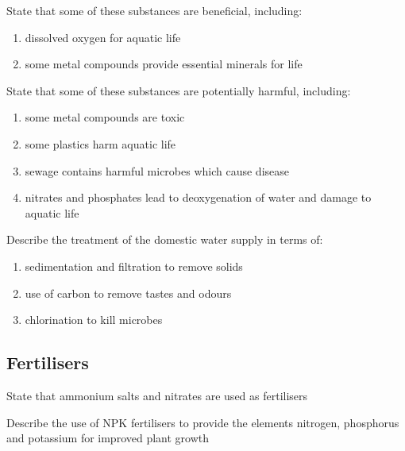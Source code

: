 \begin{point}
State that some of these substances are beneficial, including:

\begin{enumerate}[label=(\alph*)]
	\setlength\itemsep{0em}
	
	\item dissolved oxygen for aquatic life
	\item some metal compounds provide essential minerals for life
\end{enumerate}
\end{point}

\begin{point}
State that some of these substances are potentially harmful, including:
\begin{enumerate}[label=(\alph*)]
	\setlength\itemsep{0em}
	\item some metal compounds are toxic
	\item some plastics harm aquatic life
	\item sewage contains harmful microbes which cause disease
	\item nitrates and phosphates lead to deoxygenation of water and damage to aquatic life
\end{enumerate}
\end{point}

\begin{point}
Describe the treatment of the domestic water supply in terms of:
\begin{enumerate}[label=(\alph*)]
	\setlength\itemsep{0em}
	\item sedimentation and filtration to remove solids
	\item use of carbon to remove tastes and odours
	\item chlorination to kill microbes
\end{enumerate}
\end{point}

\subsection{Fertilisers}

\begin{point}
State that ammonium salts and nitrates are used as fertilisers
\end{point}
\begin{point}
Describe the use of NPK fertilisers to provide the elements nitrogen, phosphorus and potassium for 
improved plant growth
\end{point}

